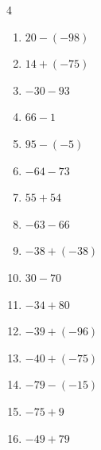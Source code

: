 \begin{multicols}{4}
\begin{enumerate}
  \item $20-(-98)$

        \phantom{$=118$}

  \item $14+(-75)$

        \phantom{$=-61$}

  \item $-30-93$

        \phantom{$=-123$}

  \item $66-1$

        \phantom{$=65$}

  \item $95-(-5)$

        \phantom{$=100$}

  \item $-64-73$

        \phantom{$=-137$}

  \item $55+54$

        \phantom{$=109$}

  \item $-63-66$

        \phantom{$=-129$}

  \item $-38+(-38)$

        \phantom{$=-76$}

  \item $30-70$

        \phantom{$=-40$}

  \item $-34+80$

        \phantom{$=46$}

\columnbreak %

\resetques

  \item $-39+(-96)$

        \phantom{$=-135$}

  \item $-40+(-75)$

        \phantom{$=-115$}

  \item $-79-(-15)$

        \phantom{$=-64$}

  \item $-75+9$

        \phantom{$=-66$}

  \item $-49+79$


\end{enumerate}
\end{multicols}
